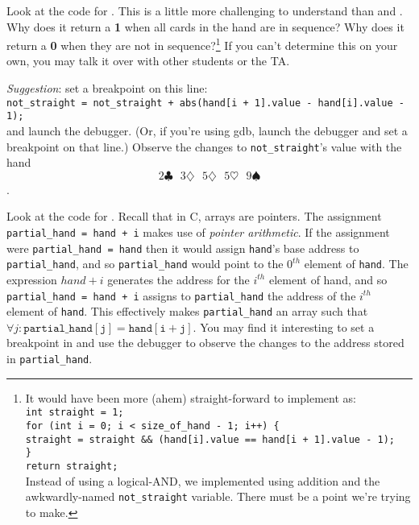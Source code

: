 Look at the code for .
This is a little more challenging to understand than  and .
Why does it return a \textbf{1} when all cards in the hand are in sequence?
Why does it return a \textbf{0} when they are not in sequence?\footnote{
    It would have been more (ahem) straight-forward to implement  as:
    \texttt{                                                                          \\
    int straight = 1;                                                                 \\
    for (int i = 0; i < size\_of\_hand - 1; i++) \{                                   \\
    \phantom{xxxx}straight = straight \&\& (hand[i].value == hand[i + 1].value - 1);  \\
    \}                                                                                \\
    return straight;                                                                  \\
    }
    Instead of using a logical-AND, we implemented  using addition and the awkwardly-named \lstinline{not_straight} variable.
    There must be a point we're trying to make.
}
If you can't determine this on your own, you may talk it over with other students or the TA\@.

\textit{Suggestion}: set a breakpoint on this line: \\
\lstinline{not_straight = not_straight + abs(hand[i + 1].value - hand[i].value - 1);} \\
and launch the debugger.
(Or, if you're using gdb, launch the debugger and set a breakpoint on that line.)
Observe the changes to \lstinline{not_straight}'s value with the hand
\[2\clubsuit\ \ \ 3\diamondsuit\ \ \ 5\diamondsuit\ \ \ 5\heartsuit\ \ \ 9\spadesuit\].
\begin{description}
\end{description}

Look at the code for .
Recall that in C, arrays are pointers.
The assignment \lstinline{partial_hand = hand + i} makes use of \textit{pointer arithmetic}.
If the assignment were \lstinline{partial_hand = hand} then it would assign \lstinline{hand}'s base address to \lstinline{partial_hand}, and so \lstinline{partial_hand} would point to the $0^{th}$ element of \lstinline{hand}.
The expression $hand+i$ generates the address for the $i^{th}$ element of \lstinline{}{hand}, and so \lstinline{partial_hand = hand + i} assigns to \lstinline{partial_hand} the address of the $i^{th}$ element of \lstinline{hand}.
This effectively makes \lstinline{partial_hand} an array such that $\forall j : \mathtt{partial\_hand[j] = hand[i+j]}$.
You may find it interesting to set a breakpoint in  and use the debugger to observe the changes to the address stored in \lstinline{partial_hand}.

